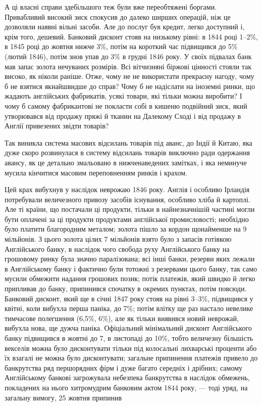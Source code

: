 
А ці власні справи здебільшого теж були вже переобтяжені боргами. Привабливий високий зиск спокусив
до далеко
ширших операцій, ніж це дозволяли наявні вільні засоби. Але до
послуг був кредит, легко доступний і, крім того, дешевий. Банковий дисконт стояв на низькому рівні:
в 1844 році 1--2\%, в 1845 році до жовтня нижче 3\%, потім на короткий час підвищився до 5\%
(лютий 1846), потім знов упав до 3\% в грудні
1846 року. У своїх підвалах банк мав запас золота нечуваних
розмірів. Всі вітчизняні біржові цінності стояли так високо, як ніколи раніше. Отже, чому не не
використати прекрасну нагоду,
чому б не взятися якнайшвидше до справ? Чому б не надіслати
на іноземні ринки, що жадають англійських фабрикатів, усякі
товари, які тільки можна виробити? І чому б самому фабрикантові не покласти собі в кишеню подвійний
зиск, який утворювався від продажу пряжі й тканин на Далекому Сході і від
продажу в Англії привезених звідти товарів?

Так виникла система масових відсилань товарів під аванс, до
Індії й Китаю, яка дуже скоро розвинулася в систему відсилань
товарів виключно ради одержання авансу, як це детально змальовано в нижченаведених замітках, і яка
неминуче мусила кінчитися масовим переповненням ринків і крахом.

Цей крах вибухнув у наслідок неврожаю 1846 року. Англія
і особливо Ірландія потребували величезного привозу засобів
існування, особливо хліба й картоплі. Але ті країни, що постачали ці продукти, тільки в
найнезначнішій частині могли бути
оплачені за ці продукти продуктами англійської промисловості;
необхідно було платити благородним металом; золота пішло за
кордон щонайменше на 9 мільйонів. З цього золота цілих
7 мільйонів взято було з запасів готівкою Англійського банку,
в наслідок чого свобода руху Англійського банку на грошовому
ринку була значно паралізована; всі інші банки, резерви яких
лежали в Англійському банку і фактично були тотожні з резервами цього банку, так само мусили
обмежити надання грошових
позик; потік платежів, який швидко й легко припливав до банку,
припинився спочатку в окремих пунктах, потім повсюди. Банковий дисконт, який ще в січні 1847 року
стояв на рівні 3--3\%, підвищився у квітні, коли вибухла перша паніка, до 7\%; потім влітку
ще раз настало невелике тимчасове полегшення (6,5\%, 6\%), але
як тільки виявився новий неврожай, вибухла нова, ще дужча паніка. Офіціальний мінімальний дисконт
Англійського банку підвищився в жовтні до 7, в листопаді до 10\%, тобто величезну більшість векселів
можна було дисконтувати тільки під колосальні
лихварські проценти або їх взагалі не можна було дисконтувати;
загальне припинення платежів привело до банкрутства ряд першорядних фірм і дуже багато середніх і
дрібних; самому Англійському банкові загрожувала небезпека банкрутства в наслідок
обмежень, покладених на нього хитромудрим банковим актом
1844 року, — тоді уряд, на загальну вимогу, 25 жовтня припинив
\parbreak{}  %
